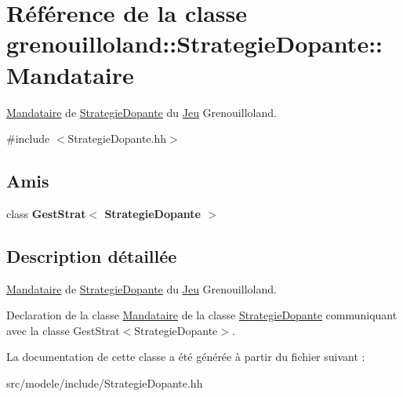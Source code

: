\hypertarget{classgrenouilloland_1_1StrategieDopante_1_1Mandataire}{\section{Référence de la classe grenouilloland\-:\-:Strategie\-Dopante\-:\-:Mandataire}
\label{classgrenouilloland_1_1StrategieDopante_1_1Mandataire}
}


\hyperlink{classgrenouilloland_1_1StrategieDopante_1_1Mandataire}{Mandataire} de \hyperlink{classgrenouilloland_1_1StrategieDopante}{Strategie\-Dopante} du \hyperlink{classgrenouilloland_1_1Jeu}{Jeu} Grenouilloland.  




{\ttfamily \#include $<$Strategie\-Dopante.\-hh$>$}

\subsection*{Amis}
\begin{DoxyCompactItemize}
\item 
\hypertarget{classgrenouilloland_1_1StrategieDopante_1_1Mandataire_a3bbe073fecd37d8a62912437ecea21c9}{class {\bfseries Gest\-Strat$<$ Strategie\-Dopante $>$}}\label{classgrenouilloland_1_1StrategieDopante_1_1Mandataire_a3bbe073fecd37d8a62912437ecea21c9}

\end{DoxyCompactItemize}


\subsection{Description détaillée}
\hyperlink{classgrenouilloland_1_1StrategieDopante_1_1Mandataire}{Mandataire} de \hyperlink{classgrenouilloland_1_1StrategieDopante}{Strategie\-Dopante} du \hyperlink{classgrenouilloland_1_1Jeu}{Jeu} Grenouilloland. 

Declaration de la classe \hyperlink{classgrenouilloland_1_1StrategieDopante_1_1Mandataire}{Mandataire} de la classe \hyperlink{classgrenouilloland_1_1StrategieDopante}{Strategie\-Dopante} communiquant avec la classe Gest\-Strat$<$\-Strategie\-Dopante$>$. 

La documentation de cette classe a été générée à partir du fichier suivant \-:\begin{DoxyCompactItemize}
\item 
src/modele/include/Strategie\-Dopante.\-hh\end{DoxyCompactItemize}
